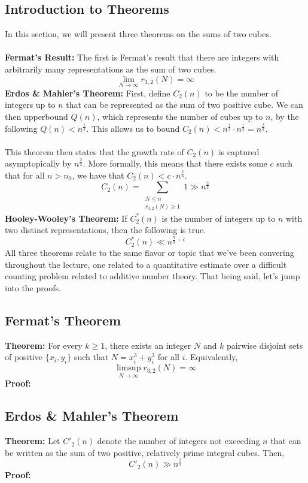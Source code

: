 \documentclass[8pt]{extarticle}
\begin{document}
\subsection{Introduction to Theorems}
In this section, we will present three theorems on the sums of two cubes. \\
\\
\textbf{Fermat's Result:} The first is Fermat's result that there are integers with arbitrarily many representations as the sum of two cubes.
$$
\lim_{N\rightarrow\infty} r_{3,2}(N) = \infty
$$
\textbf{Erdos \& Mahler's Theorem:} First, define $C_2(n)$ to be the number of integers up to $n$ that can be represented as the sum of two positive cube. We can then upperbound $Q(n)$, which represents the number of cubes up to $n$, by the following $Q(n) < n^{\frac{1}{3}}$. This allows us to bound $C_2(n) < n^{\frac{1}{3}} \cdot n^{\frac{1}{3}} = n^{\frac{2}{3}}$. \\
\\
This theorem then states that the growth rate of $C_2(n)$ is captured asymptopically by $n^{\frac{2}{3}}$. More formally, this means that there exists some $c$ such that for all $n > n_0$, we have that $C_2(n) < c \cdot n^{\frac{2}{3}}$.
$$
C_2(n) = \sum_{\substack{N \leq n \\ r_{3,2}(N) \geq 1}} 1 \gg n^{\frac{2}{3}}
$$
\textbf{Hooley-Wooley's Theorem:} If $C^*_2(n)$ is the number of integers up to $n$ with two distinct representations, then the following is true.
$$
C^*_2(n) \ll n^{\frac{5}{9} + \epsilon}
$$
All three theorems relate to the same flavor or topic that we've been convering throughout the lecture, one related to a quantitative estimate over a difficult counting problem related to additive number theory. That being said, let's jump into the proofs.
\subsection{Fermat's Theorem}
\begin{boxedsection}
\textbf{Theorem:} For every $k \geq 1$, there exists an integer $N$ and $k$ pairwise disjoint sets of positive $\{x_i,y_i\}$ such that $N = x_i^3 + y_i^3$ for all $i$. Equivalently,
$$
\limsup_{N\rightarrow \infty} r_{3,2}(N) = \infty
$$
\textbf{Proof:} 
\end{boxedsection}
\subsection{Erdos \& Mahler's Theorem}
\begin{boxedsection}
\textbf{Theorem:} Let $C'_2(n)$ denote the number of integers not exceeding $n$ that can be written as the sum of two positive, relatively prime integral cubes. Then, 
$$
C'_2(n) \gg n^{\frac{2}{3}}
$$
\textbf{Proof:} 
\end{boxedsection}
\end{document}
